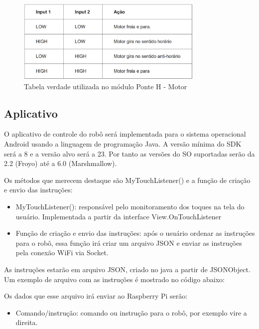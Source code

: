 \begin{figure}[H]
    \centering
    \includegraphics[width=0.8\textwidth]{figuras/tabela_ponte_H_2.eps}
    \caption{Tabela verdade utilizada no módulo Ponte H - Motor}
    \label{fig:catia01}
\end{figure}

\subsection{Aplicativo}

O aplicativo de controle do robô será implementada para o sistema operacional Android usando a linguagem de programação Java. A versão mínima do SDK será a 8 e a versão alvo será a 23. Por tanto as versões do SO suportadas serão da 2.2 (Froyo) até a 6.0 (Marshmallow).

Os métodos que merecem destaque são MyTouchListener() e a função de criação e envio das instruções:
\begin{itemize}
\item MyTouchListener(): responsável pelo monitoramento dos toques na tela do usuário. Implementada a partir da interface View.OnTouchListener
\item Função de criação e envio das instruções: após o usuário ordenar as instruções para o robô, essa função irá criar um arquivo JSON e enviar as instruções pela conexão WiFi via Socket.
\end{itemize}

As instruções estarão em arquivo JSON, criado no java a partir de JSONObject. Um exemplo de arquivo com as instruções é mostrado no código abaixo:



Os dados que esse arquivo irá enviar ao Raspberry Pi serão:
\begin{itemize}
	\item Comando/instrução: comando ou instrução para o robô, por exemplo vire a direita.
\end{itemize}

